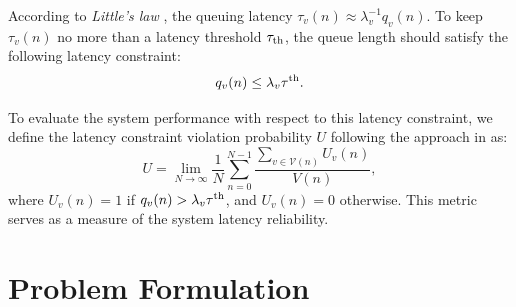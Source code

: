 \documentclass[conference, a4paper]{IEEEtran}
\theoremstyle{remark}
\begin{document}
According to \textit{Little's law} \cite{little1961proof}, the queuing latency $\tau_v(n)\approx \lambda_v^{-1}q_v(n)$. To keep $\tau_v(n)$ no more than a latency threshold $\tau_{\rm th}$, the queue length should satisfy the following latency constraint:
\begin{equation}
    q_v(n) \leq \lambda_v \tau^{{\rm th}}.
    \label{eq:queue length cons}
\end{equation}

To evaluate the system performance with respect to this latency constraint, we define the latency constraint violation probability $U$ following the approach in \cite{kien17} as:
\begin{equation}
    U = \lim_{N\rightarrow\infty}\frac{1}{N}\sum_{n=0}^{N-1}  \frac{\sum_{v\in\mathcal{V}(n)}U_v(n)}{V(n)},
    \label{eq:violation probability}
\end{equation}
where $U_v(n) = 1$ if $q_v(n) > \lambda_v \tau^{{\rm th}}$, and $U_v(n) = 0$ otherwise. This metric serves as a measure of the system latency reliability.


\section{Problem Formulation}{\label{sec:Problem Formulation}}
\end{document}

